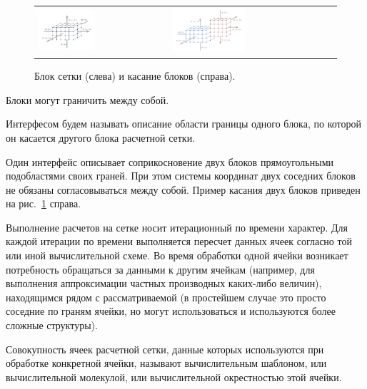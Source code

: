 \begin{figure}[ht]
\centering
\begin{tabular}{ll}
\includegraphics[width=0.45\textwidth]{fig/par_1-block.pdf}
&
\includegraphics[width=0.45\textwidth]{fig/par_2-block-block.pdf}
\end{tabular}
\singlespacing
{}\caption{Блок сетки (слева) и касание блоков (справа).}
\label{fig:text_2_block_block}
\end{figure}

Блоки могут граничить между собой.

\begin{definition}
Интерфесом будем называть описание области границы одного блока, по которой он касается другого блока расчетной сетки.
\end{definition}

Один интерфейс описывает соприкосновение двух блоков прямоугольными подобластями своих граней.
При этом системы координат двух соседних блоков не обязаны согласовываться между собой.
Пример касания двух блоков приведен на рис.~\ref{fig:text_2_block_block} справа.

Выполнение расчетов на сетке носит итерационный по времени характер.
Для каждой итерации по времени выполняется пересчет данных ячеек согласно той или иной вычислительной схеме.
Во время обработки одной ячейки возникает потребность обращаться за данными к другим ячейкам (например, для выполнения аппроксимации частных производных каких-либо величин), находящимся рядом с рассматриваемой (в простейшем случае это просто соседние по граням ячейки, но могут использоваться и используются более сложные структуры).

\begin{definition}
Совокупность ячеек расчетной сетки, данные которых используются при обработке конкретной ячейки, называют вычислительным шаблоном, или вычислительной молекулой, или вычислительной окрестностью этой ячейки.
\end{definition}

